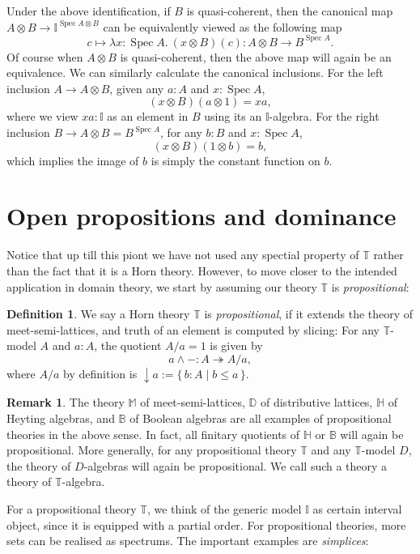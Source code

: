 \documentclass[12pt]{amsart}
\theoremstyle{definition}
\newtheorem{definition}[theorem]{Definition}
\newtheorem{remark}[theorem]{Remark}
\newcommand{\mbb}[1]{\mathbb{#1}}
\newcommand{\T}{\mbb T}
\newcommand{\I}{\mbb I}
\newcommand{\scomp}[2]{\{\,#1\mid#2\,\}}
\newcommand{\surj}{\twoheadrightarrow}
\newcommand{\cv}{\operatorname{\downarrow}}
\newcommand{\ld}[2]{\lambda #1\!\colon\!\!#2.\ }
\newcommand{\spec}{\operatorname{Spec}}
\begin{document}
Under the above identification, if $B$ is quasi-coherent, then the canonical map $A \otimes B \to \I^{\spec A \otimes B}$ can be equivalently viewed as the following map 
\[ c \mapsto \ld{x}{\spec A} (x\otimes B)(c) : A \otimes B \to B^{\spec A}. \]
Of course when $A \otimes B$ is quasi-coherent, then the above map will again be an equivalence. We can similarly calculate the canonical inclusions. For the left inclusion $A \to A \otimes B$, given any $a : A$ and $x : \spec A$,
\[ (x \otimes B)(a \otimes 1) = xa, \]
where we view $xa : \I$ as an element in $B$ using its an $\I$-algebra. For the right inclusion $B \to A \otimes B = B^{\spec A}$, for any $b : B$ and $x : \spec A$,
\[ (x \otimes B)(1 \otimes b) = b, \]
which implies the image of $b$ is simply the constant function on $b$.


\section{Open propositions and dominance}\label{sec:dominance}

Notice that up till this piont we have not used any spectial property of $\T$ rather than the fact that it is a Horn theory. However, to move closer to the intended application in domain theory, we start by assuming our theory $\T$ is \emph{propositional}: 

\begin{definition}
  We say a Horn theory $\T$ is \emph{propositional}, if it extends the theory of meet-semi-lattices, and truth of an element is computed by slicing: For any $\T$-model $A$ and $a:A$, the quotient $A/a=1$ is given by
  \[ a \wedge - : A \surj A/a, \]
  where $A/a$ by definition is $\cv a := \scomp{b:A}{b\le a}$.
\end{definition}

\begin{remark}
  The theory $\mbb M$ of meet-semi-lattices, $\mbb D$ of distributive lattices, $\mbb H$ of Heyting algebras, and $\mbb B$ of Boolean algebras are all examples of propositional theories in the above sense. In fact, all finitary quotients of $\mbb H$ or $\mbb B$ will again be propositional. More generally, for any propositional theory $\T$ and any $\T$-model $D$, the theory of $D$-algebras will again be propositional. We call such a theory a theory of $\T$-algebra.
\end{remark}

For a propositional theory $\T$, we think of the generic model $\I$ as certain interval object, since it is equipped with a partial order. For propositional theories, more sets can be realised as spectrums. The important examples are \emph{simplices}:
\end{document}
